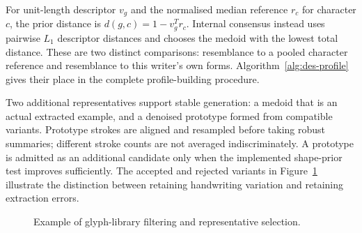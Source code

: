 For unit-length descriptor $v_g$ and the normalised median reference $r_c$ for character $c$, the prior distance is $d(g,c)=1-v_g^Tr_c$. Internal consensus instead uses pairwise $L_1$ descriptor distances and chooses the medoid with the lowest total distance. These are two distinct comparisons: resemblance to a pooled character reference and resemblance to this writer's own forms. Algorithm~\ref{alg:des-profile} gives their place in the complete profile-building procedure.
\begin{designalgorithm}
\caption{Labelled handwriting to a persistent writer profile}
\label{alg:des-profile}
\begin{designpseudo}
\end{designpseudo}
\end{designalgorithm}

Two additional representatives support stable generation: a medoid that is an actual extracted example, and a denoised prototype formed from compatible variants. Prototype strokes are aligned and resampled before taking robust summaries; different stroke counts are not averaged indiscriminately. A prototype is admitted as an additional candidate only when the implemented shape-prior test improves sufficiently. The accepted and rejected variants in Figure~\ref{fig:des-glyphquality} illustrate the distinction between retaining handwriting variation and retaining extraction errors.
\begin{figure}[!htbp]\centering
{}
\caption{Example of glyph-library filtering and representative selection.}
\label{fig:des-glyphquality}
\end{figure}

